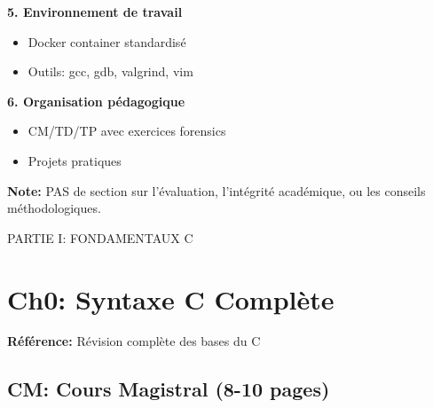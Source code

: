 \documentclass[10pt,a4paper]{article}
\begin{document}
\textbf{5. Environnement de travail}
\begin{itemize}
\item Docker container standardisé
\item Outils: gcc, gdb, valgrind, vim
\end{itemize}

\textbf{6. Organisation pédagogique}
\begin{itemize}
\item CM/TD/TP avec exercices forensics
\item Projets pratiques
\end{itemize}

\textbf{Note:} PAS de section sur l'évaluation, l'intégrité académique, ou les conseils méthodologiques.

\newpage

\begin{partbox}
PARTIE I: FONDAMENTAUX C
\end{partbox}

\section{Ch0: Syntaxe C Complète}

\textbf{Référence:} Révision complète des bases du C

\subsection*{CM: Cours Magistral (8-10 pages)}
\end{document}
